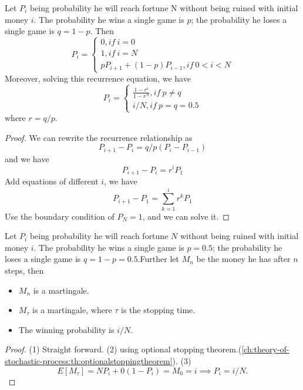 \begin{refsection}
\begin{lemma}
	Let $P_i$ being probability he will reach fortune N without being ruined with initial money $i$. The probability he wins a single game is $p$; the probability he loses a single game is $q=1-p$. Then
	$$P_i = \begin{cases}
	0, if ~ i = 0\\
	1, if ~ i = N\\
	pP_{i+1} + (1-p)P_{i-1}, if ~ 0 < i < N
	\end{cases}$$
	Moreover, solving this recurrence equation, we have
	$$P_i = \begin{cases}
	\frac{1 - r^i}{1 - r^N}, if ~ p\neq q\\
	i/N, if ~ p = q = 0.5
	\end{cases}$$
	where $r = q/p$. 
\end{lemma}
\begin{proof}
	We can rewrite the recurrence relationship as
	$$P_{i+1}- P_i = q/p(P_i - P_{i-1})$$
	and we have
	$$P_{i+1}- P_i = r^i P_1$$
	Add equations of different $i$, we have
	$$P_{i+1} - P_1 = \sum_{k=1}^i r^k P_1$$
	Use the boundary condition of $P_N = 1$, and we can solve it.
\end{proof}

\begin{lemma}\cite[220]{privault2013understanding}
	Let $P_i$ being probability he will reach fortune $N$ without being ruined with initial money $i$. The probability he wins a single game is $p=0.5$; the probability he loses a single game is $q=1-p=0.5$.Further let $M_n$ be the money he has after $n$ steps, then
	\begin{itemize}
		\item $M_n$ is a martingale.
		\item $M_\tau$ is a martingale, where $\tau$ is the stopping time.
		\item The winning probability is $i/N$.
	\end{itemize}
\end{lemma}
\begin{proof}
	(1) Straight forward. (2) using optional stopping theorem.(\autoref{ch:theory-of-stochastic-process:th:optionalstoppingtheorem}). (3) $$E[M_\tau] = N P_i + 0 (1 - P_i) = M_0 = i \implies P_i = i/N.$$
\end{proof}


\end{refsection}
